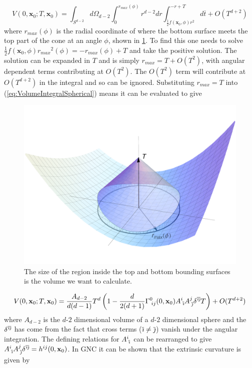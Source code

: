 \documentclass[12pt]{article}
\newcommand{\be}{\begin{equation}}
\newcommand{\ee}{\end{equation}}
\begin{document}
\be\label{eq:VolumeIntegralSpherical}
V(0,\mathbf{x}_0;T,\mathbf{x}_0)=\int_{S^{d-2}}
d\Omega_{d-2}
\int_{0}^{r_{max}(\phi)}r^{d-2}dr
\int_{\frac{1}{2}f(\mathbf{x}_0,\phi)r^2}^{-r+T}
d\overline{t}+O(T^{d+2})
\ee
where $r_{max}(\phi)$ is the radial coordinate of where the bottom surface meets the top part of the cone at an angle $\phi$, shown in \ref{fig:cone_plot}. To find this one needs to solve $\frac{1}{2}f(\mathbf{x}_0,\phi){r_{max}}^2(\phi)=-r_{max}(\phi)+T$ and take the positive solution. The solution can be expanded in $T$ and is simply $r_{max}=T+O(T^2)$, with angular dependent terms contributing at $O(T^2)$. The $O(T^2)$ term will contribute at $O(T^{d+2})$ in the integral and so can be ignored. Substituting $r_{max}=T$ into (\ref{eq:VolumeIntegralSpherical}) means it can be evaluated to give
\begin{figure}[t]
  \centering
    \includegraphics[scale=0.5]{coneplot}
     \caption{The size of the region inside the top and bottom bounding surfaces is the volume we want to calculate.}
     \label{fig:cone_plot}
\end{figure}
\be\label{eq:VolumeNoK}
V(0,\mathbf{x}_0;T,\mathbf{x}_0)
=\frac{A_{d-2}}{d(d-1)}T^d\left(1-\frac{d}{2(d+1)}\Gamma^{0}_{\;ij}(0,\mathbf{x}_0)A^{i}_{\;\overline{\emph\i}}A^{j}_{\;\overline{\emph\j}}\delta^{\overline{\emph\i}\overline{\emph\j}}T\right)
+O(T^{d+2})
\ee
where $A_{d-2}$ is the $d$-$2$ dimensional volume of a $d$-$2$ dimensional sphere and the $\delta^{\overline{\emph\i}\overline{\emph\j}}$ has come from the fact that cross terms ($\overline{\emph\i}\neq \overline{\emph\j}$) vanish under the angular integration. The defining relations for $A^{i}_{\;\overline{\emph\i}}$ can be rearranged to give $A^{i}_{\;\overline{\emph\i}}A^{j}_{\;\overline{\emph\j}}\delta^{\overline{\emph\i}\overline{\emph\j}}=h^{ij}(0,\mathbf{x}_0)$. In GNC it can be shown that the extrinsic curvature is given by
\end{document}
